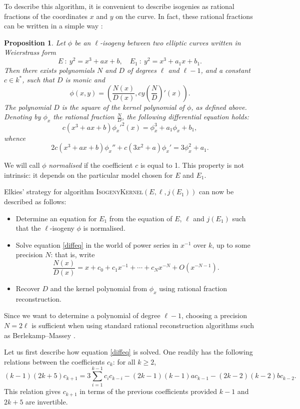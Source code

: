\documentclass{article}
\newcommand{\algstyle}[1]{\textsc{#1}}
\newtheorem{prop}[theorem]{Proposition}
\theoremstyle{definition}
\begin{document}
To describe this algorithm, it is convenient to describe isogenies as
rational fractions of the coordinates $x$ and $y$ on the curve. In fact, these
rational fractions can be written in a simple way \cite{}:

\begin{prop}
Let $\phi$ be an $\ell$-isogeny between two elliptic curves written in
Weierstrass form
\[
E\ :\ y^2 = x^3 + ax + b, \quad E_1\ :\ y^2 = x^3 + a_1x + b_1.
\]
Then there exists polynomials $N$ and $D$ of degrees $\ell$ and $\ell-1$,
and a constant $c\in k^*$, such that $D$ is monic and
\[
\phi(x, y) = \left(\frac{N(x)}{D(x)}, cy\left(\frac{N}{D}\right)'(x)\right).
\]
The polynomial $D$ is the square of the kernel polynomial of $\phi$, as defined
above. Denoting by $\phi_x$ the rational fraction $\frac{N}{D}$,
the following differential equation holds:
\[
c(x^3 + ax + b)\phi_x'^2(x) = \phi_x^3 + a_1\phi_x + b_1,
\]
whence
\begin{equation}
\label{diffeq}
2c(x^3 + ax + b)\phi_x'' + c(3x^2 + a)\phi_x' =
 3\phi_x^2 + a_1.
\end{equation}
\end{prop}

We will call $\phi$ \emph{normalised} if the coefficient $c$ is equal to 1.
This property is not intrinsic: it depends on the particular model chosen
for $E$ and $E_1$.

Elkies' strategy for algorithm \algstyle{IsogenyKernel}$(E, \ell, j(E_1))$ can now be described
as follows:
\begin{itemize}
\item Determine an equation for $E_1$ from the equation of $E$, $\ell$ and
 $j(E_1)$ such that the $\ell$-isogeny $\phi$ is normalised.
\item Solve equation \ref{diffeq} in the world of power series in $x^{-1}$ over $k$, up to
 some precision $N$: that is, write
\[
\frac{N(x)}{D(x)} = x + c_0 + c_1 x^{-1} + \cdots + c_N x^{-N} + O(x^{-N-1}).
\]
\item Recover $D$ and the kernel polynomial from $\phi_x$ using rational
 fraction reconstruction.
\end{itemize}

Since we want to determine a polynomial of degree $\ell-1$, choosing a precision $N = 2\ell$
is sufficient when using standard rational reconstruction algorithms such as Berlekamp--Massey \cite{}.

Let us first describe how equation \ref{diffeq} is solved. One readily
has the following relations between the coefficients $c_k$: for all $k\geq 2$,
\begin{equation}
\label{eq:rec}
 (k-1)(2k+5)c_{k+1} = 3\sum_{i=1}^{k-1}c_i c_{k-i}
	- (2k-1)(k-1)a c_{k-1} - (2k-2)(k-2)b c_{k-2}.
\end{equation}
This relation gives $c_{k+1}$ in terms of the previous coefficients provided $k-1$
and $2k+5$ are invertible.
\end{document}
